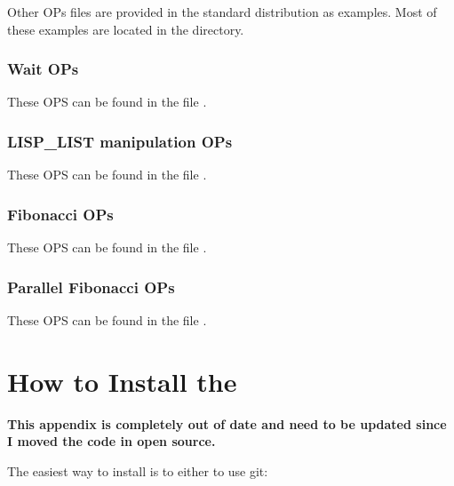 Other OPs files are provided in the standard distribution as examples. Most of
these examples are located in the  directory.



\subsection{Wait OPs}

These OPS can be found in the file .



\subsection{LISP\_LIST manipulation OPs}

These OPS can be found in the file .



\subsection{Fibonacci OPs}

These OPS can be found in the file .



\subsection{Parallel Fibonacci OPs}

These OPS can be found in the file .



\chapter{How to Install the \COPRSDE{}}

\textbf{This appendix is completely out of date and need to be updated since I moved
the code in open source.}

The easiest way to install \COPRSDE{} is to either to use git:

\noindent
{}


